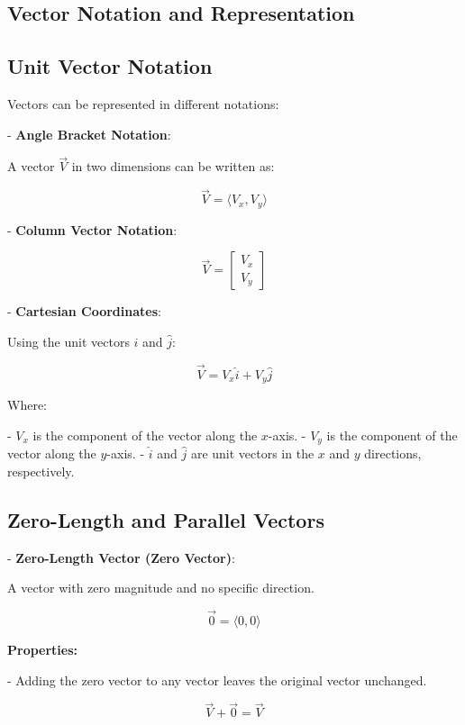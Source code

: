 \documentclass{article}
\begin{document}
\begin{multicols}{2}

\section*{Vector Notation and Representation}

\subsection*{Unit Vector Notation}

Vectors can be represented in different notations:

- \textbf{Angle Bracket Notation}:

  A vector \(\vec{V}\) in two dimensions can be written as:

  \[
  \vec{V} = \langle V_x, V_y \rangle
  \]

- \textbf{Column Vector Notation}:

  \[
  \vec{V} = \begin{bmatrix} V_x \\ V_y \end{bmatrix}
  \]

- \textbf{Cartesian Coordinates}:

  Using the unit vectors \(\hat{i}\) and \(\hat{j}\):

  \[
  \vec{V} = V_x \hat{i} + V_y \hat{j}
  \]

Where:

- \( V_x \) is the component of the vector along the \( x \)-axis.
- \( V_y \) is the component of the vector along the \( y \)-axis.
- \( \hat{i} \) and \( \hat{j} \) are unit vectors in the \( x \) and \( y \) directions, respectively.

\subsection*{Zero-Length and Parallel Vectors}

- \textbf{Zero-Length Vector (Zero Vector)}:

  A vector with zero magnitude and no specific direction.

  \[
  \vec{0} = \langle 0, 0 \rangle
  \]

  \textbf{Properties:}

  - Adding the zero vector to any vector leaves the original vector unchanged.

    \[
    \vec{V} + \vec{0} = \vec{V}
    \]


\end{multicols}
\end{document}
